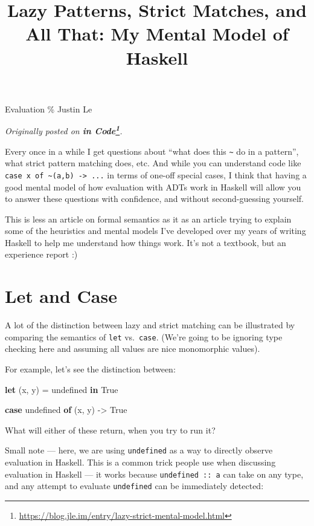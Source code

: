 \documentclass[]{article}
\title{Lazy Patterns, Strict Matches, and All That: My Mental Model of Haskell}
\newenvironment{Shaded}{}{}
\newcommand{\DataTypeTok}[1]{\textcolor[rgb]{0.56,0.13,0.00}{#1}}
\newcommand{\FunctionTok}[1]{\textcolor[rgb]{0.02,0.16,0.49}{#1}}
\newcommand{\KeywordTok}[1]{\textcolor[rgb]{0.00,0.44,0.13}{\textbf{#1}}}
\newcommand{\NormalTok}[1]{#1}
\newcommand{\OtherTok}[1]{\textcolor[rgb]{0.00,0.44,0.13}{#1}}
\renewcommand{\href}[2]{#2\footnote{\url{#1}}}
\begin{document}
\maketitle

Evaluation \% Justin Le

\emph{Originally posted on
\textbf{\href{https://blog.jle.im/entry/lazy-strict-mental-model.html}{in
Code}}.}

Every once in a while I get questions about ``what does this
\texttt{\textasciitilde{}} do in a pattern'', what strict pattern matching does,
etc. And while you can understand code like
\texttt{case\ x\ of\ \textasciitilde{}(a,b)\ -\textgreater{}\ ...} in terms of
one-off special cases, I think that having a good mental model of how evaluation
with ADTs work in Haskell will allow you to answer these questions with
confidence, and without second-guessing yourself.

This is less an article on formal semantics as it as an article trying to
explain some of the heuristics and mental models I've developed over my years of
writing Haskell to help me understand how things work. It's not a textbook, but
an experience report :)

\hypertarget{let-and-case}{%
\section{Let and Case}\label{let-and-case}}

A lot of the distinction between lazy and strict matching can be illustrated by
comparing the semantics of \texttt{let} vs.~\texttt{case}. (We're going to be
ignoring type checking here and assuming all values are nice monomorphic
values).

For example, let's see the distinction between:

\begin{Shaded}
\begin{Highlighting}[]
\KeywordTok{let}\NormalTok{ (x, y) }\OtherTok{=} \FunctionTok{undefined}
\KeywordTok{in}  \DataTypeTok{True}

\KeywordTok{case} \FunctionTok{undefined} \KeywordTok{of}
\NormalTok{    (x, y) }\OtherTok{{-}>} \DataTypeTok{True}
\end{Highlighting}
\end{Shaded}

What will either of these return, when you try to run it?

Small note --- here, we are using \texttt{undefined} as a way to directly
observe evaluation in Haskell. This is a common trick people use when discussing
evaluation in Haskell --- it works because \texttt{undefined\ ::\ a} can take on
any type, and any attempt to evaluate \texttt{undefined} can be immediately
detected:
\end{document}
